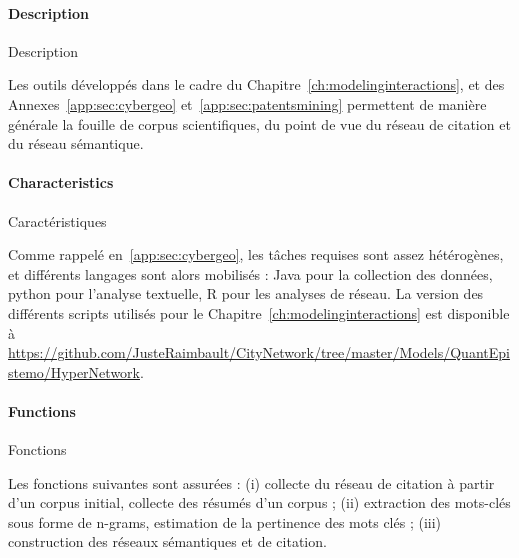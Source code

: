 \paragraph{Description}{Description}

Les outils développés dans le cadre du Chapitre~\ref{ch:modelinginteractions}, et des Annexes~\ref{app:sec:cybergeo} et~\ref{app:sec:patentsmining} permettent de manière générale la fouille de corpus scientifiques, du point de vue du réseau de citation et du réseau sémantique.

\paragraph{Characteristics}{Caractéristiques}

Comme rappelé en~\ref{app:sec:cybergeo}, les tâches requises sont assez hétérogènes, et différents langages sont alors mobilisés : Java pour la collection des données, python pour l'analyse textuelle, R pour les analyses de réseau. La version des différents scripts utilisés pour le Chapitre~\ref{ch:modelinginteractions} est disponible à \url{https://github.com/JusteRaimbault/CityNetwork/tree/master/Models/QuantEpistemo/HyperNetwork}.


\paragraph{Functions}{Fonctions}

Les fonctions suivantes sont assurées : (i) collecte du réseau de citation à partir d'un corpus initial, collecte des résumés d'un corpus ; (ii) extraction des mots-clés sous forme de n-grams, estimation de la pertinence des mots clés ; (iii) construction des réseaux sémantiques et de citation.








